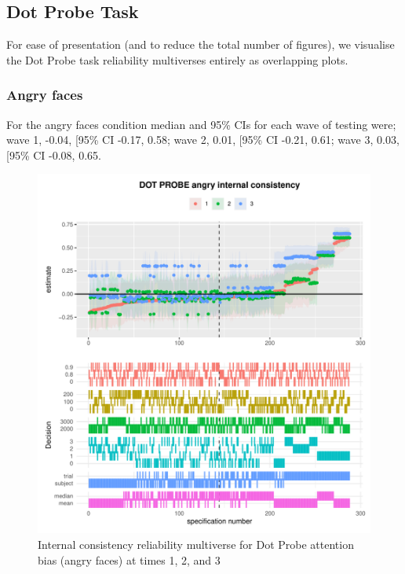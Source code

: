 \documentclass[
  man,floatsintext]{apa6}
\begin{document}
\hypertarget{dot-probe-task-1}{%
\subsection{Dot Probe Task}\label{dot-probe-task-1}}

For ease of presentation (and to reduce the total number of figures), we visualise the Dot Probe task reliability multiverses entirely as overlapping plots.

\hypertarget{angry-faces}{%
\subsubsection{Angry faces}\label{angry-faces}}

For the angry faces condition median and 95\% CIs for each wave of testing were; wave 1, -0.04, {[}95\% CI -0.17, 0.58; wave 2, 0.01, {[}95\% CI -0.21, 0.61; wave 3, 0.03, {[}95\% CI -0.08, 0.65.

\begin{figure}
\centering
\includegraphics{Reliability_Multiverse_files/figure-latex/unnamed-chunk-13-1.pdf}
\caption{\label{fig:unnamed-chunk-13}Internal consistency reliability multiverse for Dot Probe attention bias (angry faces) at times 1, 2, and 3}
\end{figure}
\end{document}
